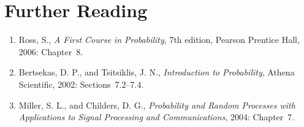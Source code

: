 

%
%

\section*{Further Reading}

\begin{small}
\begin{enumerate}
\item Ross, S., \emph{A First Course in Probability}, 7th edition, Pearson Prentice Hall, 2006: Chapter~8.
\item Bertsekas, D. P., and Tsitsiklis, J. N., \emph{Introduction to Probability}, Athena Scientific, 2002: Sections~7.2--7.4.
\item Miller, S. L., and Childers, D. G., \emph{Probability and Random Processes with Applications to Signal Processing and Communications}, 2004: Chapter~7.
\end{enumerate}
\end{small}

